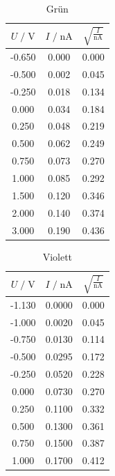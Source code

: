 \begin{table}
    \centering
    \caption{Grün}
    \label{tab:gruen}
    \begin{tabular}{c c c}
    \toprule
    $ U \;/\; \si{\volt} $ & $I \;/\; \si{\nano\ampere}$ &
    $ \sqrt{\frac{I}{\si{\nano\ampere}}}$\\
    \midrule 
       -0.650 & 0.000 & 0.000\\   
       -0.500 & 0.002 & 0.045\\  
       -0.250 & 0.018 & 0.134\\  
        0.000 & 0.034 & 0.184\\ 
        0.250 & 0.048 & 0.219\\  
        0.500 & 0.062 & 0.249\\
        0.750 & 0.073 & 0.270\\  
        1.000 & 0.085 & 0.292\\  
        1.500 & 0.120 & 0.346\\ 
        2.000 & 0.140 & 0.374\\ 
        3.000 & 0.190 & 0.436\\       
    \bottomrule
    \end{tabular}
\end{table}

\begin{table}
    \centering
    \caption{Violett}
    \label{tab:viol}
    \begin{tabular}{c c c}
    \toprule
    $ U \;/\; \si{\volt} $ & $I \;/\; \si{\nano\ampere}$ &
    $ \sqrt{\frac{I}{\si{\nano\ampere}}}$\\
    \midrule 
      -1.130 & 0.0000 & 0.000\\
      -1.000 & 0.0020 & 0.045\\
      -0.750 & 0.0130 & 0.114\\
      -0.500 & 0.0295 & 0.172\\
      -0.250 & 0.0520 & 0.228\\
       0.000 & 0.0730 & 0.270\\
       0.250 & 0.1100 & 0.332\\
       0.500 & 0.1300 & 0.361\\
       0.750 & 0.1500 & 0.387\\
       1.000 & 0.1700 & 0.412\\     
    \bottomrule
    \end{tabular}
\end{table}

